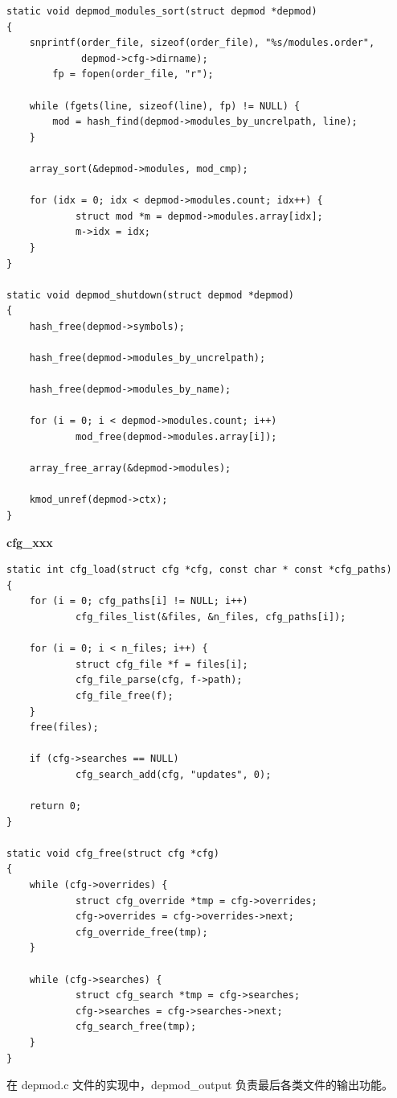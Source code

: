 \documentclass[11pt,a4paper]{article}
\begin{document}
{\begin{shaded}
\begin{verbatim}
static void depmod_modules_sort(struct depmod *depmod)
{
    snprintf(order_file, sizeof(order_file), "%s/modules.order",
             depmod->cfg->dirname);
        fp = fopen(order_file, "r");

    while (fgets(line, sizeof(line), fp) != NULL) {
        mod = hash_find(depmod->modules_by_uncrelpath, line);
    }

    array_sort(&depmod->modules, mod_cmp);

    for (idx = 0; idx < depmod->modules.count; idx++) {
            struct mod *m = depmod->modules.array[idx];
            m->idx = idx;
    }
}

static void depmod_shutdown(struct depmod *depmod)
{
    hash_free(depmod->symbols);

    hash_free(depmod->modules_by_uncrelpath);

    hash_free(depmod->modules_by_name);

    for (i = 0; i < depmod->modules.count; i++)
            mod_free(depmod->modules.array[i]);

    array_free_array(&depmod->modules);

    kmod_unref(depmod->ctx);
}
\end{verbatim}\end{shaded}}
\textbf{cfg\_xxx}

{\begin{shaded}\begin{verbatim}
static int cfg_load(struct cfg *cfg, const char * const *cfg_paths)
{
    for (i = 0; cfg_paths[i] != NULL; i++)
            cfg_files_list(&files, &n_files, cfg_paths[i]);

    for (i = 0; i < n_files; i++) {
            struct cfg_file *f = files[i];
            cfg_file_parse(cfg, f->path);
            cfg_file_free(f);
    }
    free(files);

    if (cfg->searches == NULL)
            cfg_search_add(cfg, "updates", 0);

    return 0;
}

static void cfg_free(struct cfg *cfg)
{
    while (cfg->overrides) {
            struct cfg_override *tmp = cfg->overrides;
            cfg->overrides = cfg->overrides->next;
            cfg_override_free(tmp);
    }

    while (cfg->searches) {
            struct cfg_search *tmp = cfg->searches;
            cfg->searches = cfg->searches->next;
            cfg_search_free(tmp);
    }
}
\end{verbatim}\end{shaded}}
在 depmod.c 文件的实现中，depmod\_output 负责最后各类文件的输出功能。
\end{document}
